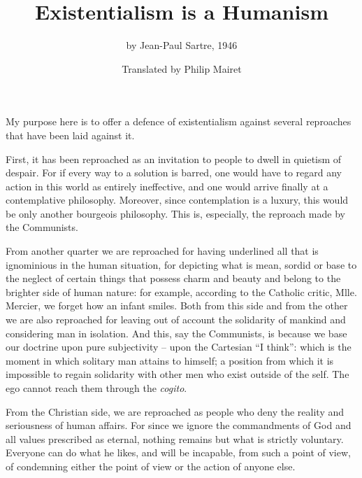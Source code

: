 \documentclass[12pt]{article}
\title{\vspace{-2.5cm}Existentialism is a Humanism\vspace{-8mm}}
\author{by Jean-Paul Sartre, 1946}
\date{\vspace{-1em}\normalsize Translated by Philip Mairet\vspace{-1em}}
\begin{document}
\maketitle
My purpose here is to offer a defence of existentialism against several reproaches that have been laid against it.

First, it has been reproached as an invitation to people to dwell in quietism of despair. For if every way to a solution is barred, one would have to regard any action in this world as entirely ineffective, and one would arrive finally at a contemplative philosophy. Moreover, since contemplation is a luxury, this would be only another bourgeois philosophy. This is, especially, the reproach made by the Communists.

From another quarter we are reproached for having underlined all that is ignominious in the human situation, for depicting what is mean, sordid or base to the neglect of certain things that possess charm and beauty and belong to the brighter side of human nature: for example, according to the Catholic critic, Mlle. Mercier, we forget how an infant smiles. Both from this side and from the other we are also reproached for leaving out of account the solidarity of mankind and considering man in isolation. And this, say the Communists, is because we base our doctrine upon pure subjectivity – upon the Cartesian “I think”: which is the moment in which solitary man attains to himself; a position from which it is impossible to regain solidarity with other men who exist outside of the self. The ego cannot reach them through the \textit{cogito}.

From the Christian side, we are reproached as people who deny the reality and seriousness of human affairs. For since we ignore the commandments of God and all values prescribed as eternal, nothing remains but what is strictly voluntary. Everyone can do what he likes, and will be incapable, from such a point of view, of condemning either the point of view or the action of anyone else.
\end{document}
